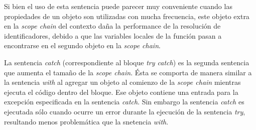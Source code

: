 Si bien el uso de esta sentencia puede parecer muy conveniente cuando las propiedades de un objeto son utilizadas con mucha frecuencia, este objeto extra en la
\emph{scope chain} del contexto daña la performance de la resolución de identificadores, debido a que las variables locales de la función pasan a encontrarse en el segundo
objeto en la \emph{scope chain}.

La sentencia \emph{catch} (correspondiente al bloque \emph{try catch}) es la segunda sentencia que aumenta el tamaño de la \emph{scope chain}. Ésta se comporta de manera
similar a la sentencia \emph{with} al agregar un objeto al comienzo de la \emph{scope chain} mientras ejecuta el código dentro del bloque. Ese objeto contiene una entrada
para la excepción especificada en la sentencia \emph{catch}. Sin embargo la sentencia \emph{catch} es ejecutada sólo cuando ocurre un error durante la ejecución de la
sentencia \emph{try}, resultando menos problemática que la snetencia \emph{with}.

